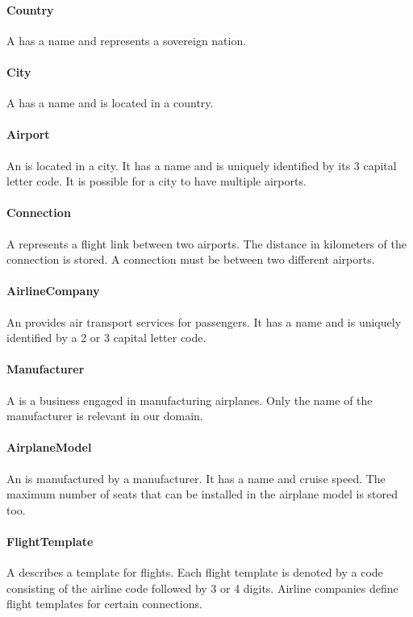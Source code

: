\documentclass[a4paper]{article}
\begin{document}
\paragraph{Country}
A  has a name and represents a sovereign nation.
\paragraph{City}
A  has a name and is located in a country.
\paragraph{Airport}
An  is located in a city.
It has a name and is uniquely identified by its 3 capital letter code.
It is possible for a city to have multiple airports.
\paragraph{Connection}
A  represents a flight link between two airports.
The distance in kilometers of the connection is stored.
A connection must be between two different airports.
\paragraph{AirlineCompany}
An  provides air transport services for passengers.
It has a name and is uniquely identified by a 2 or 3 capital letter code.
\paragraph{Manufacturer}
A  is a business engaged in manufacturing airplanes.
Only the name of the manufacturer is relevant in our domain.
\paragraph{AirplaneModel}
An  is manufactured by a manufacturer.
It has a name and cruise speed.
The maximum number of seats that can be installed in the airplane model is stored too.
\paragraph{FlightTemplate}
A  describes a template for flights.
Each flight template is denoted by a code consisting of the airline code followed by 3 or 4 digits.
Airline companies define flight templates for certain connections.
\end{document}
